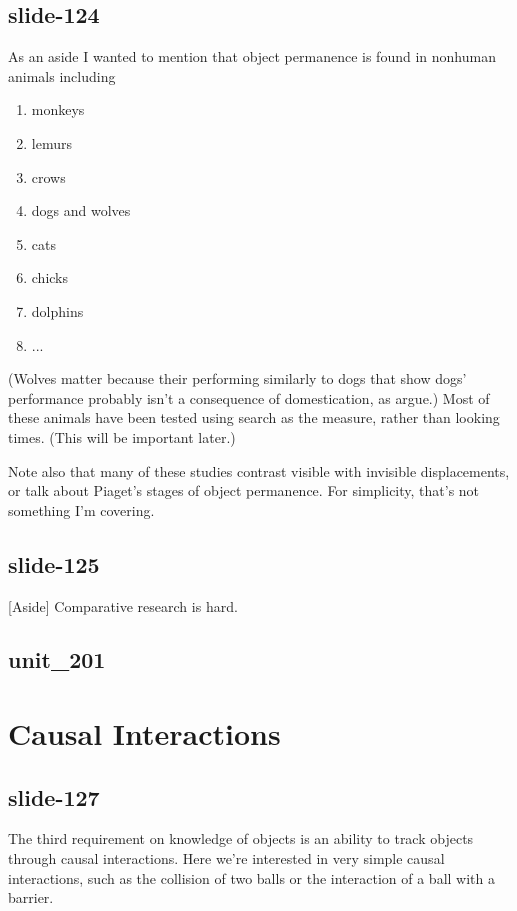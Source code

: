 \documentclass[12pt,\papersize]{extarticle}
\begin{document}
\subsection{slide-124}
As an aside I wanted to mention that object permanence is found in nonhuman animals including
\begin{enumerate}
\item monkeys \citep{santos:2006_cotton-top}
\item lemurs \citep{deppe:2009_object}
\item crows \citep{hoffmann:2011_ontogeny}
\item dogs and wolves \citep{fiset:2013_object}
\item cats \citep{triana:1981_object}
\item chicks \citep{chiandetti:2011_chicks_op}
\item dolphins \citep{jaakkola:2010_what}
\item ...
\end{enumerate}
(Wolves matter because their performing similarly to dogs that show dogs' performance probably isn't a consequence of domestication, as \citet{fiset:2013_object} argue.)
Most of these animals have been tested using search as the measure, rather than looking times. (This will be important later.)
 
Note also that many of these studies contrast visible with invisible displacements, or talk about Piaget's stages of object permanence. For simplicity, that's not something I'm covering.
 
 
\subsection{slide-125}
[Aside] Comparative research is hard.
 
 
\subsection{unit\_201}
 
\section{Causal Interactions}
 
 
\subsection{slide-127}
The third requirement on knowledge of objects is an ability to track objects through causal interactions.
Here we're interested in very simple causal interactions, such as the collision of two balls or the interaction of a ball with a barrier.
 
\end{document}
